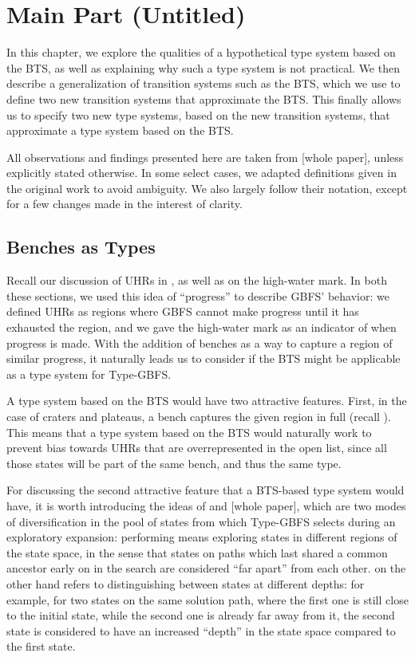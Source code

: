 \chapter{Main Part (Untitled)}

In this chapter, we explore the qualities of a hypothetical type system based on the BTS, as well as explaining why such a type system is not practical. We then describe a generalization of transition systems such as the BTS, which we use to define two new transition systems that approximate the BTS. This finally allows us to specify two new type systems, based on the new transition systems, that approximate a type system based on the BTS.

All observations and findings presented here are taken from [whole paper], unless explicitly stated otherwise. In some select cases, we adapted definitions given in the original work to avoid ambiguity. We also largely follow their notation, except for a few changes made in the interest of clarity.

\section{Benches as Types}
\label{sec:bench-types}

Recall our discussion of UHRs in , as well as  on the high-water mark. In both these sections, we used this idea of ``progress'' to describe GBFS' behavior: we defined UHRs as regions where GBFS cannot make progress until it has exhausted the region, and we gave the high-water mark as an indicator of when progress is made. With the addition of benches as a way to capture a region of similar progress, it naturally leads us to consider if the BTS might be applicable as a type system for Type-GBFS.

A type system based on the BTS would have two attractive features. First, in the case of craters and plateaus, a bench captures the given region in full (recall ). This means that a type system based on the BTS would naturally work to prevent bias towards UHRs that are overrepresented in the open list, since all those states will be part of the same bench, and thus the same type.

For discussing the second attractive feature that a BTS-based type system would have, it is worth introducing the ideas of  and  [whole paper], which are two modes of diversification in the pool of states from which Type-GBFS selects during an exploratory expansion: performing  means exploring states in different regions of the state space, in the sense that states on paths which last shared a common ancestor early on in the search are considered ``far apart'' from each other.  on the other hand refers to distinguishing between states at different depths: for example, for two states on the same solution path, where the first one is still close to the initial state, while the second one is already far away from it, the second state is considered to have an increased ``depth'' in the state space compared to the first state.

